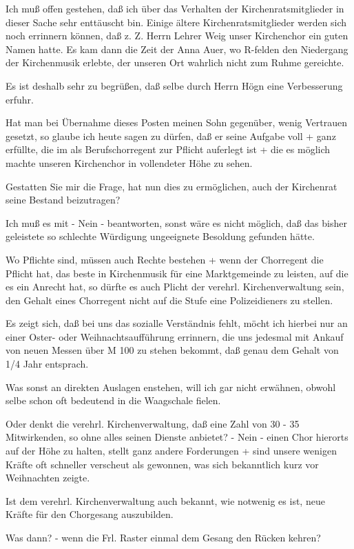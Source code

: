 \documentclass[12pt,a4paper]{book}
\begin{document}
Ich muß offen gestehen, daß ich über das Verhalten der Kirchenratsmitglieder in
dieser Sache sehr enttäuscht bin. Einige ältere Kirchenratsmitglieder werden
sich noch errinnern können, daß z. Z. Herrn Lehrer Weig unser Kirchenchor ein
guten Namen hatte. Es kam dann die Zeit der Anna Auer, wo R-felden den
Niedergang der Kirchenmusik erlebte, der unseren Ort wahrlich nicht zum Ruhme
gereichte.

Es ist deshalb sehr zu begrüßen, daß selbe durch Herrn Högn eine Verbesserung
erfuhr.

Hat man bei Übernahme dieses Posten meinen Sohn gegenüber, wenig Vertrauen
gesetzt, so glaube ich heute sagen zu dürfen, daß er seine Aufgabe voll + ganz
erfüllte, die im als Berufschorregent zur Pflicht auferlegt ist + die es möglich
machte unseren Kirchenchor in vollendeter Höhe zu sehen.

Gestatten Sie mir die Frage, hat nun dies zu ermöglichen, auch der Kirchenrat
seine Bestand beizutragen?

Ich muß es mit - Nein - beantworten, sonst wäre es nicht möglich, daß das bisher
geleistete so schlechte Würdigung ungeeignete Besoldung gefunden hätte.

Wo Pflichte sind, müssen auch Rechte bestehen + wenn der Chorregent die Pflicht
hat, das beste in Kirchenmusik für eine Marktgemeinde zu leisten, auf die es ein
Anrecht hat, so dürfte es auch Plicht der verehrl. Kirchenverwaltung sein, den
Gehalt eines Chorregent nicht auf die Stufe eine Polizeidieners zu stellen.

Es zeigt sich, daß bei uns das sozialle Verständnis fehlt, möcht ich hierbei nur
an einer Oster- oder Weihnachtsaufführung errinnern, die uns jedesmal mit Ankauf
von neuen Messen über M 100 zu stehen bekommt, daß genau dem Gehalt von 1/4 Jahr
entsprach.

Was sonst an direkten Auslagen enstehen, will ich gar nicht erwähnen, obwohl
selbe schon oft bedeutend in die Waagschale fielen.

Oder denkt die verehrl. Kirchenverwaltung, daß eine Zahl von 30 - 35
Mitwirkenden, so ohne alles seinen Dienste anbietet? - Nein - einen Chor
hierorts auf der Höhe zu halten, stellt ganz andere Forderungen + sind unsere
wenigen Kräfte oft schneller verscheut als gewonnen, was sich bekanntlich kurz
vor Weihnachten zeigte.

Ist dem verehrl. Kirchenverwaltung auch bekannt, wie notwenig es ist, neue
Kräfte für den Chorgesang auszubilden.

Was dann? - wenn die Frl. Raster einmal dem Gesang den Rücken kehren?
\end{document}
